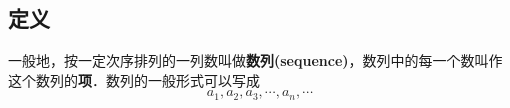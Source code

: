 
\subsection{定义}
一般地，按一定次序排列的一列数叫做\textbf{数列(sequence)}，数列中的每一个数叫作这个数列的\textbf{项}．数列的一般形式可以写成
\begin{equation}
a_1,a_2,a_3,\cdots,a_n,\cdots
\end{equation}